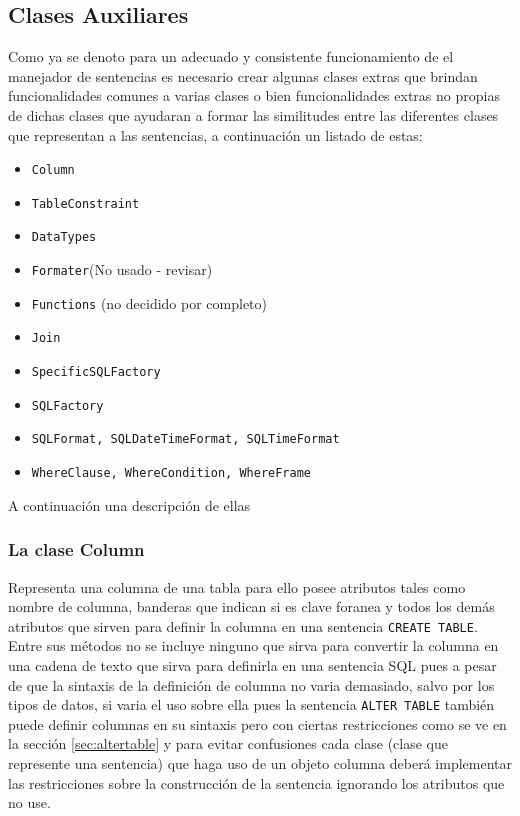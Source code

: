\subsection{Clases Auxiliares} \label{seccion:disenio:clases-auxiliares}
Como ya se denoto para un adecuado y consistente funcionamiento de el manejador de sentencias es necesario crear algunas clases extras que brindan funcionalidades comunes a varias clases o bien funcionalidades extras no propias de dichas clases que ayudaran a formar las similitudes entre las diferentes clases que representan a las sentencias, a continuación un listado de estas:

\begin{itemize}
\item \verb=Column=
\item \verb=TableConstraint=
\item \verb=DataTypes=
\item \verb=Formater=(No usado - revisar)
\item \verb=Functions= (no decidido por completo)
\item \verb=Join=
\item \verb=SpecificSQLFactory=
\item \verb=SQLFactory=
\item \verb=SQLFormat, SQLDateTimeFormat, SQLTimeFormat=
\item \verb=WhereClause, WhereCondition, WhereFrame=
\end{itemize}
A continuación una descripción de ellas

\subsubsection{La clase Column}
Representa una columna de una tabla para ello posee atributos tales como nombre de columna, banderas que indican si es clave foranea y todos los demás atributos que sirven para definir la columna en una sentencia \verb=CREATE TABLE=. Entre sus métodos no se incluye ninguno que sirva para convertir la columna en una cadena  de texto que sirva para definirla en una sentencia SQL pues a pesar de que la sintaxis de la definición de columna no varia demasiado, salvo por los tipos de datos, si varia el uso sobre ella pues la sentencia \verb=ALTER TABLE= también puede definir columnas en su sintaxis pero con ciertas restricciones como se ve en la sección \ref{sec:altertable} y para evitar confusiones cada clase (clase que represente una sentencia) que haga uso de un objeto columna deberá implementar las restricciones sobre la construcción de la sentencia ignorando los atributos que no use.

